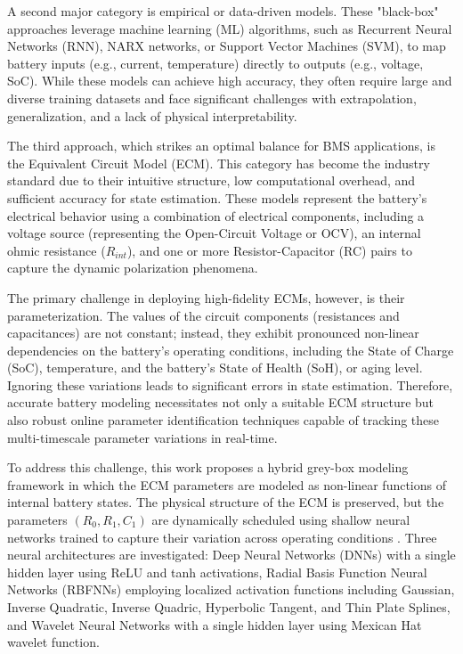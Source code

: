 \documentclass[lettersize,journal]{IEEEtran}
\begin{document}
A second major category is empirical or data-driven models. These "black-box" approaches leverage machine learning (ML) algorithms, such as Recurrent Neural Networks (RNN), NARX networks, or Support Vector Machines (SVM), to map battery inputs (e.g., current, temperature) directly to outputs (e.g., voltage, SoC)\cite{kawahara2023battery, wang2021coestimation, xia2024hybrid}. While these models can achieve high accuracy, they often require large and diverse training datasets and face significant challenges with extrapolation, generalization, and a lack of physical interpretability\cite{valizadeh2024machine, kawahara2023battery}.

The third approach, which strikes an optimal balance for BMS applications, is the Equivalent Circuit Model (ECM). This category has become the industry standard due to their intuitive structure, low computational overhead, and sufficient accuracy for state estimation\cite{tekin2024comparative}. These models represent the battery's electrical behavior using a combination of electrical components, including a voltage source (representing the Open-Circuit Voltage or OCV), an internal ohmic resistance ($R_{int}$), and one or more Resistor-Capacitor (RC) pairs to capture the dynamic polarization phenomena\cite{khalfi2021electric}.

The primary challenge in deploying high-fidelity ECMs, however, is their parameterization. The values of the circuit components (resistances and capacitances) are not constant; instead, they exhibit pronounced non-linear dependencies on the battery's operating conditions, including the State of Charge (SoC), temperature, and the battery's State of Health (SoH), or aging level\cite{tran2021comprehensive, Sheikh2024}. Ignoring these variations leads to significant errors in state estimation. Therefore, accurate battery modeling necessitates not only a suitable ECM structure but also robust online parameter identification techniques capable of tracking these multi-timescale parameter variations in real-time\cite{pai2023online, yang2023improved, beelen2018experiment}.

To address this challenge, this work proposes a hybrid grey-box modeling framework in which the ECM parameters are modeled as non-linear functions of internal battery states. The physical structure of the ECM is preserved, but the parameters $( R_0, R_1, C_1 )$ are dynamically scheduled using shallow neural networks trained to capture their variation across operating conditions \cite{Sheikh2024}. Three neural architectures are investigated: Deep Neural Networks (DNNs) with a single hidden layer using ReLU and tanh activations, Radial Basis Function Neural Networks (RBFNNs) employing localized activation functions including Gaussian, Inverse Quadratic, Inverse Quadric, Hyperbolic Tangent, and Thin Plate Splines, and Wavelet Neural Networks with a single hidden layer using Mexican Hat wavelet function.
\end{document}
